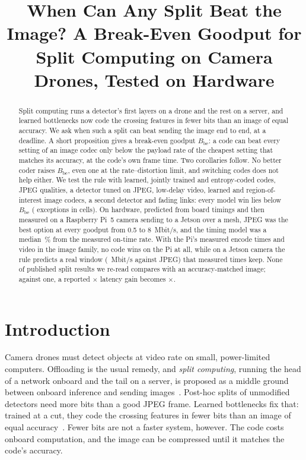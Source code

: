 \documentclass[conference,10pt]{IEEEtran}
\begin{document}
\title{When Can Any Split Beat the Image? A Break-Even Goodput for Split Computing on Camera Drones, Tested on Hardware}
\author{}
\maketitle

\begin{abstract}
Split computing runs a detector's first layers on a drone and the rest on a server, and learned bottlenecks now code
the crossing features in fewer bits than an image of equal accuracy. We ask when such a split can beat sending the
image end to end, at a deadline. A short proposition gives a break-even goodput $B_{\mathrm{be}}$: a code can beat
every setting of an image codec only below the payload rate of the cheapest setting that matches its accuracy, at the
code's own frame time. Two corollaries follow. No better coder raises $B_{\mathrm{be}}$, even one at the
rate--distortion limit, and switching codes does not help either. We test the rule with \BeCodes{} learned, jointly
trained and entropy-coded codes, \BeJpegQualities{} JPEG qualities, a detector tuned on JPEG, low-delay video, learned
and region-of-interest image codecs, a second detector and fading links: every model win lies below $B_{\mathrm{be}}$
(\BeViolations{} exceptions in \BeCells{} cells). On hardware, predicted from board timings and then measured on a
Raspberry Pi~5 camera sending to a Jetson over a mesh, JPEG was the best option at every goodput from 0.5 to
8~Mbit/s, and the timing model was a median \BpModelErrPct\,\% from the measured on-time rate. With the Pi's measured
encode times and video in the image family, no code wins on the Pi at all, while on a Jetson camera the rule predicts
a real window (\BpJetHeadJpeg~Mbit/s against JPEG) that measured times keep. None of \BpLitPapers{} published split
results we re-read compares with an accuracy-matched image; against one, a reported \BpLitAutoRaw$\times$ latency gain
becomes \BpLitAutoMatched$\times$.
\end{abstract}

\section{Introduction}
Camera drones must detect objects at video rate on small, power-limited computers. Offloading is the usual remedy,
and \emph{split computing}, running the head of a network onboard and the tail on a server, is proposed as a middle
ground between onboard inference and sending images~\cite{kang2017neurosurgeon,matsubara2022survey}. Post-hoc splits
of unmodified detectors need more bits than a good JPEG frame. Learned bottlenecks fix that: trained at a cut, they
code the crossing features in fewer bits than an image of equal
accuracy~\cite{matsubara2022supervised,matsubara2023sc2,furutanpey2024frankensplit}. Fewer bits are not a faster
system, however. The code costs onboard computation, and the image can be compressed until it matches the code's
accuracy.
\end{document}
